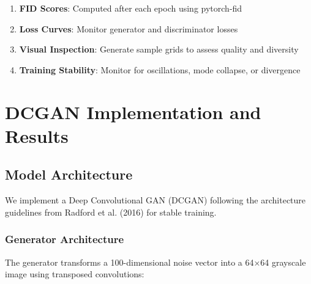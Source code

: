 \documentclass[conference,12pt]{IEEEtran}
\begin{document}
\begin{enumerate}
    \item \textbf{FID Scores}: Computed after each epoch using pytorch-fid
    \item \textbf{Loss Curves}: Monitor generator and discriminator losses
    \item \textbf{Visual Inspection}: Generate sample grids to assess quality and diversity
    \item \textbf{Training Stability}: Monitor for oscillations, mode collapse, or divergence
\end{enumerate}

\section{DCGAN Implementation and Results}

\subsection{Model Architecture}

We implement a Deep Convolutional GAN (DCGAN) following the architecture guidelines from Radford et al. (2016) for stable training.

\subsubsection{Generator Architecture}

The generator transforms a 100-dimensional noise vector into a 64×64 grayscale image using transposed convolutions:
\end{document}
